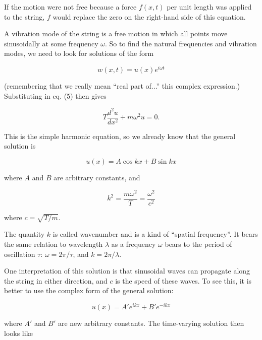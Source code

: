   If the motion were not free because a force $f(x,t)$ per unit length was 
  applied to the string, $f$ would replace the zero on the right-hand side of 
  this equation. 

  A vibration mode of the string is a free motion in which all points move 
  sinusoidally at some frequency $\omega$. So to find the natural frequencies 
  and vibration modes, we need to look for solutions of the form 

  \begin{equation*}w(x,t) = u(x) e^{i \omega t} \tag{6}\end{equation*} 

  (remembering that we really mean ``real part of...'' this complex 
  expression.) Substituting in eq. (5) then gives 

  \begin{equation*}T \dfrac{d^2u}{dx^2} + m \omega^2 u = 0. 
  \tag{7}\end{equation*} 

  This is the simple harmonic equation, so we already know that the general 
  solution is 

  \begin{equation*}u(x) = A \cos kx + B \sin kx \tag{8}\end{equation*} 

  \noindent{}where $A$ and $B$ are arbitrary constants, and 

  \begin{equation*}k^2 =\dfrac{m \omega^2}{T} = \dfrac{\omega^2}{c^2} 
  \tag{9}\end{equation*} 

  \noindent{}where $c=\sqrt{T/m}$. 

  The quantity $k$ is called wavenumber and is a kind of ``spatial frequency''. 
  It bears the same relation to wavelength $\lambda$ as a frequency $\omega$ 
  bears to the period of oscillation $\tau$: $\omega=2 \pi/\tau$, and $k=2 
  \pi/\lambda$. 

  One interpretation of this solution is that sinusoidal waves can propagate 
  along the string in either direction, and $c$ is the speed of these waves. To 
  see this, it is better to use the complex form of the general solution: 

  \begin{equation*}u(x) =A' e^{ikx} + B' e^{-ikx} \tag{10}\end{equation*} 

  \noindent{}where $A'$ and $B'$ are new arbitrary constants. The time-varying 
  solution then looks like 


